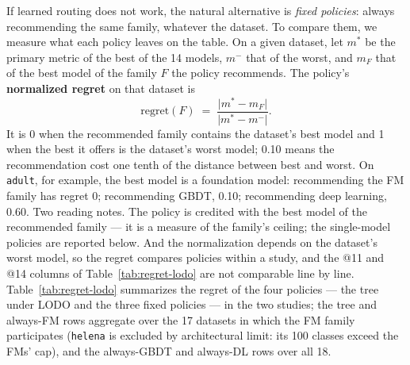 If learned routing does not work, the natural alternative is
\emph{fixed policies}: always recommending the same family,
whatever the dataset. To compare them, we measure what each policy
leaves on the table. On a given dataset, let $m^{*}$ be the primary
metric of the best of the 14 models, $m^{-}$ that of the worst, and
$m_{F}$ that of the best model of the family $F$ the policy
recommends. The policy's \textbf{normalized regret} on that dataset
is
\begin{equation}
\mathrm{regret}(F) \;=\;
\frac{\lvert m^{*} - m_{F} \rvert}{\lvert m^{*} - m^{-} \rvert}.
\label{eq:regret-normalizado}
\end{equation}
It is 0 when the recommended family contains the dataset's best
model and 1 when the best it offers is the dataset's worst model;
0.10 means the recommendation cost one tenth of the distance between
best and worst. On \texttt{adult}, for example, the best model is a
foundation model: recommending the FM family has regret 0;
recommending GBDT, 0.10; recommending deep learning, 0.60. Two
reading notes. The policy is credited with the best model of the
recommended family --- it is a measure of the family's ceiling; the
single-model policies are reported below. And the normalization depends on
the dataset's worst model, so the regret compares policies within a
study, and the @11 and @14 columns of Table~\ref{tab:regret-lodo}
are not comparable line by line. Table~\ref{tab:regret-lodo}
summarizes the regret of the four policies --- the tree under LODO
and the three fixed policies --- in the two studies; the tree and
always-FM rows aggregate over the 17 datasets in which the FM family
participates (\texttt{helena} is excluded by architectural limit:
its 100 classes exceed the FMs' cap), and the always-GBDT and
always-DL rows over all 18.

